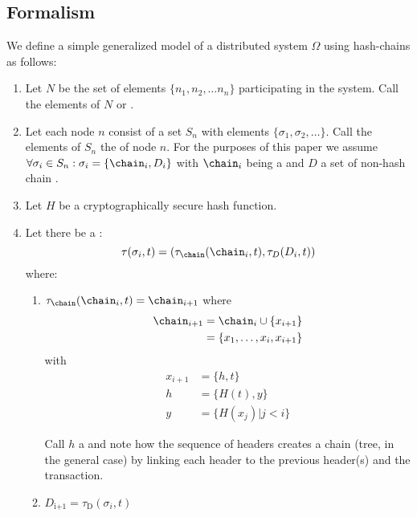 \documentclass[twocolumn,showpacs,%
  nofootinbib,aps,superscriptaddress,%
  eqsecnum,prd,notitlepage,showkeys,10pt]{revtex4-1}
\begin{document}
\subsection{Formalism}
\label{sec:formalism}

We define a simple generalized model of a distributed system $\Omega$ using hash-chains as follows:
\begin{enumerate}
\item Let $N$ be the set of elements $\{n_1,n_2,\dots n_n\}$ participating in the system. Call the elements of $N$  or .
\item Let each node $n$ consist of a set $S_n$ with elements $\{\sigma_1,\sigma_2,\dots\}$. Call the elements of $S_n$ the  of node $n$. For the purposes of this paper we assume $\forall \sigma_i \in S_n : \sigma_i = \{ \chain_i, D_i\}$ with $\chain_i$ being a  and $D$  a set of non-hash chain .
\item Let $H$ be a cryptographically secure hash function.
\item Let there be a :
\begin{equation}
\tau(\sigma_i, t) = (\tau_\chain(\chain_i, t), \tau_D(D_i,t))
\end{equation}
where:
\begin{enumerate}
\item
$\tau_\chain(\chain_i,t) = \chain_{i+1}$ where
\begin{equation}
\begin{split}
 \chain_{i+1} &= \chain_{i} \cup \{x_{i+1}\} \\
  &= \{x_1, \dots, x_i, x_{i+1}\}
\end{split}
\end{equation}
with
\begin{equation}
\begin{split}
x_{i+1} &= \{h,t\} \\
h &= \{ H(t),y\} \\
y &= \{H(x_j) | j<i\}
\end{split}
\end{equation}

Call $h$ a  and note how the sequence of headers creates a chain (tree, in the general case) by linking each header to the previous header(s) and the transaction.
\item $D_\text{i+1}=\tau_\mathrm{D}(\sigma_i,t)$


\end{enumerate}
\end{enumerate}
\end{document}
